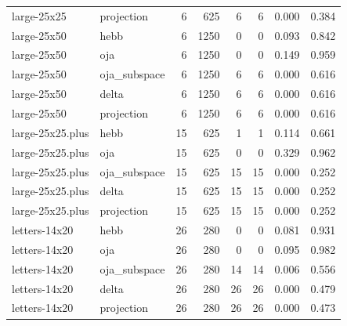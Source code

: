 \begin{tabular}{llrrrrrr}
large-25x25 & projection & 6 & 625 & 6 & 6 & 0.000 & 0.384 \\
large-25x50 & hebb & 6 & 1250 & 0 & 0 & 0.093 & 0.842 \\
large-25x50 & oja & 6 & 1250 & 0 & 0 & 0.149 & 0.959 \\
large-25x50 & oja\_subspace & 6 & 1250 & 6 & 6 & 0.000 & 0.616 \\
large-25x50 & delta & 6 & 1250 & 6 & 6 & 0.000 & 0.616 \\
large-25x50 & projection & 6 & 1250 & 6 & 6 & 0.000 & 0.616 \\
large-25x25.plus & hebb & 15 & 625 & 1 & 1 & 0.114 & 0.661 \\
large-25x25.plus & oja & 15 & 625 & 0 & 0 & 0.329 & 0.962 \\
large-25x25.plus & oja\_subspace & 15 & 625 & 15 & 15 & 0.000 & 0.252 \\
large-25x25.plus & delta & 15 & 625 & 15 & 15 & 0.000 & 0.252 \\
large-25x25.plus & projection & 15 & 625 & 15 & 15 & 0.000 & 0.252 \\
letters-14x20 & hebb & 26 & 280 & 0 & 0 & 0.081 & 0.931 \\
letters-14x20 & oja & 26 & 280 & 0 & 0 & 0.095 & 0.982 \\
letters-14x20 & oja\_subspace & 26 & 280 & 14 & 14 & 0.006 & 0.556 \\
letters-14x20 & delta & 26 & 280 & 26 & 26 & 0.000 & 0.479 \\
letters-14x20 & projection & 26 & 280 & 26 & 26 & 0.000 & 0.473 \\
\bottomrule
\end{tabular}
